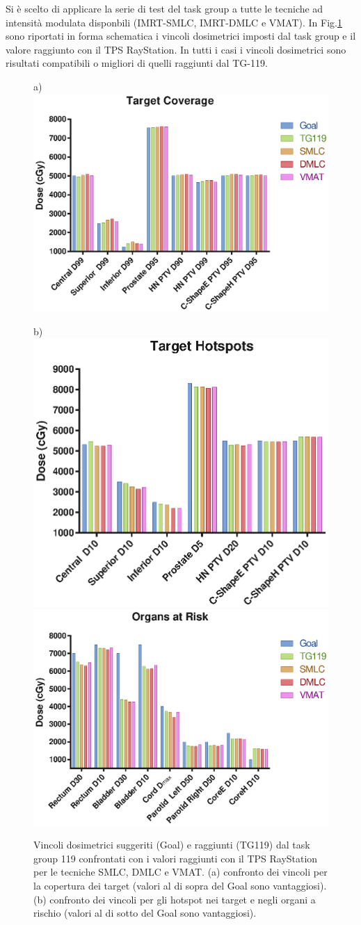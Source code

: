 Si è scelto di applicare la serie di test del task group a tutte le tecniche ad intensità modulata disponbili (IMRT-SMLC, IMRT-DMLC e VMAT). In Fig.\ref{fig:TG119_stats} sono riportati in forma schematica i vincoli dosimetrici imposti dal task group e il valore raggiunto con il TPS RayStation. In tutti i casi i vincoli dosimetrici sono risultati compatibili o migliori di quelli raggiunti dal TG-119.
\begin{figure}
\centering
a)\includegraphics[width=.7\textwidth]{./cap2/TG119_Plots/Target_Coverage.eps}\\
\centerline{
b)\includegraphics[width=.55\textwidth]{./cap2/TG119_Plots/Target_Hotspots.eps}
\includegraphics[width=.7\textwidth]{./cap2/TG119_Plots/OARs.eps}}
\caption{Vincoli dosimetrici suggeriti (Goal) e raggiunti (TG119) dal task group 119 confrontati con i valori raggiunti con il TPS RayStation per le tecniche SMLC, DMLC e VMAT. (a) confronto dei vincoli per la copertura dei target (valori al di sopra del Goal sono vantaggiosi). (b) confronto dei vincoli per gli hotspot nei target e negli organi a rischio (valori al di sotto del Goal sono vantaggiosi). }
\label{fig:TG119_stats}
\end{figure}

